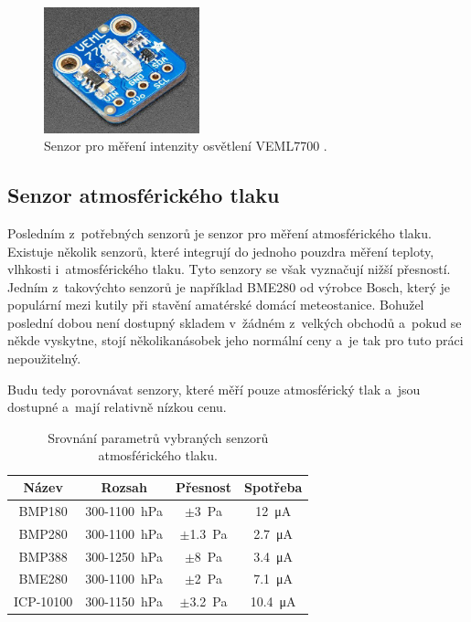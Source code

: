 \begin{figure}[h!]
    \centering
    \includegraphics[width=0.4\textwidth]{obrazky/veml7700.png}
    \caption[Senzor pro měření intenzity osvětlení VEML7700.]{Senzor pro měření intenzity osvětlení VEML7700 \cite{VEML7700}.}
    \label{fig_VEML7700}
\end{figure}

\subsection{Senzor atmosférického tlaku}

Posledním z~potřebných senzorů je senzor pro měření atmosférického tlaku. Existuje několik senzorů, které integrují do jednoho pouzdra měření teploty, vlhkosti i~atmosférického tlaku. Tyto senzory se však vyznačují nižší přesností. Jedním z~takovýchto senzorů je například BME280 od výrobce Bosch, který je populární mezi kutily při stavění amatérské domácí meteostanice. Bohužel poslední dobou není dostupný skladem v~žádném z~velkých obchodů a~pokud se někde vyskytne, stojí několikanásobek jeho normální ceny a~je tak pro tuto práci nepoužitelný.

Budu tedy porovnávat senzory, které měří pouze atmosférický tlak a~jsou dostupné a~mají relativně nízkou cenu.

\begin{table}[h]
    \caption{Srovnání parametrů vybraných senzorů atmosférického tlaku.}
    \centering
    \begin{tabular}{c|ccc}
        \textbf{Název} & \textbf{Rozsah}                     & \textbf{Přesnost}      & \textbf{Spotřeba}        \\ \hline
        BMP180 \cite{dat_BMP180}         & \SI{300}{}-\SI{1100}{\hecto\pascal} & $\pm$\SI{3}{\pascal}   & \SI{12}{\micro\ampere}   \\
        BMP280 \cite{dat_BMP280}         & \SI{300}{}-\SI{1100}{\hecto\pascal} & $\pm$\SI{1,3}{\pascal} & \SI{2,7}{\micro\ampere}  \\
        BMP388 \cite{dat_BMP388}         & \SI{300}{}-\SI{1250}{\hecto\pascal} & $\pm$\SI{8}{\pascal}   & \SI{3,4}{\micro\ampere}  \\
        BME280 \cite{dat_BME280}         & \SI{300}{}-\SI{1100}{\hecto\pascal} & $\pm$\SI{2}{\pascal}   & \SI{7,1}{\micro\ampere}  \\
        ICP-10100 \cite{dat_ICP-10100}      & \SI{300}{}-\SI{1150}{\hecto\pascal} & $\pm$\SI{3,2}{\pascal} & \SI{10,4}{\micro\ampere} 
    \end{tabular}
    \label{tab_AirPressureSensors}
\end{table}

